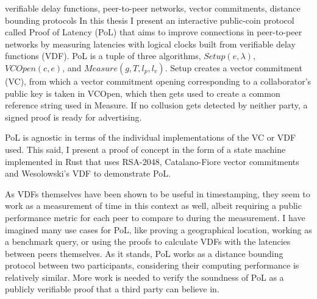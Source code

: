 \begin{itabstract}{verifiable delay functions, peer-to-peer networks, vector commitments, distance bounding protocols}
	In this thesis I present an interactive public-coin protocol called Proof of Latency (PoL) that aims to improve connections in peer-to-peer networks by measuring latencies with logical clocks built from verifiable delay functions (VDF). PoL is a tuple of three algorithms, \(Setup(e, \lambda)\), \(VCOpen(c, e)\), and \(Measure(g, T, l_p, l_v)\). Setup creates a vector commitment (VC), from which a vector commitment opening corresponding to a collaborator's public key is taken in VCOpen, which then gets used to create a common reference string used in Measure. If no collusion gets detected by neither party, a signed proof is ready for advertising.
	
	PoL is agnostic in terms of the individual implementations of the VC or VDF used. This said, I present a proof of concept in the form of a state machine implemented in Rust that uses RSA-2048, Catalano-Fiore vector commitments and Wesolowski's VDF to demonstrate PoL.
	
	As VDFs themselves have been shown to be useful in timestamping, they seem to work as a measurement of time in this context as well, albeit requiring a public performance metric for each peer to compare to during the measurement. I have imagined many use cases for PoL, like proving a geographical location, working as a benchmark query, or using the proofs to calculate VDFs with the latencies between peers themselves.
	As it stands, PoL works as a distance bounding protocol between two participants, considering their computing performance is relatively similar. More work is needed to verify the soundness of PoL as a publicly verifiable proof that a third party can believe in.
\end{itabstract}
